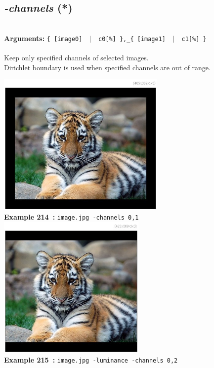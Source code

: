 \documentclass[a4paper,11pt,twoside]{book}
\begin{document}
\subsection{\emph{-channels} (*)}\vspace*{-0.5em}
~\\\textbf{Arguments: } 
{\small \texttt{\{ [image0] ~$|$~ c0[\%] \},\_\{ [image1] ~$|$~ c1[\%] \}}}\\~\\
Keep only specified channels of selected images.
~\\Dirichlet boundary is used when specified channels are out of range.
\begin{center}\includegraphics[keepaspectratio=true,height=7cm,width=\textwidth]{img/gmic_def214.jpg}\\
{\footnotesize \textbf{Example 214~:} \texttt{image.jpg -channels 0,1}}
\\\includegraphics[keepaspectratio=true,height=7cm,width=\textwidth]{img/gmic_def215.jpg}\\
{\footnotesize \textbf{Example 215~:} \texttt{image.jpg -luminance -channels 0,2}}
\end{center}
\end{document}

